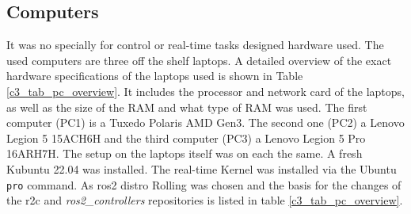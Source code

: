 \subsection{Computers}
It was no specially for control or real-time tasks designed hardware used. The used computers are three off the shelf laptops. A detailed overview of the exact hardware specifications of the laptops used is shown in Table \ref{c3_tab_pc_overview}. It includes the processor and network card of the laptops, as well as the size of the RAM and what type of RAM was used. The first computer (PC1) is a Tuxedo Polaris AMD Gen3. The second one (PC2) a Lenovo Legion 5 15ACH6H and the third computer (PC3) a Lenovo Legion 5 Pro 16ARH7H.\newline
The setup on the laptops itself was on each the same. A fresh Kubuntu 22.04 was installed. The real-time Kernel was installed via the Ubuntu \texttt{pro} command. As \gls{ros2} distro Rolling was chosen and the basis for the changes of the \gls{r2c} and \textit{ros2\_controllers} repositories is listed in table \ref{c3_tab_pc_overview}.

